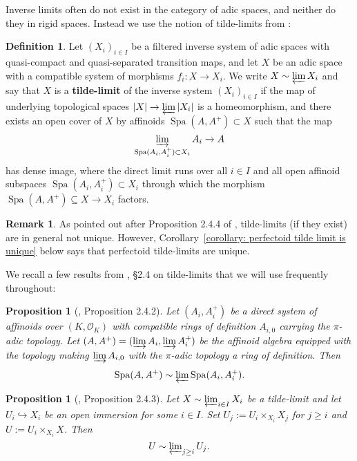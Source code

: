 \documentclass[10pt,oneside]{amsart}
\newtheorem{proposition}[theorem]{Proposition}
\theoremstyle{definition}
\newtheorem{definition}[theorem]{Definition}
\newtheorem{remark}[theorem]{Remark}
\begin{document}
	Inverse limits often do not exist in the category of adic spaces, and neither do they in rigid spaces. Instead we use the notion of tilde-limits from \cite[Definition 2.4.2]{huber2013etale}:	
	\begin{definition} 
Let $(X_i)_{i\in I}$ be a filtered inverse system of adic spaces with quasi-compact and quasi-separated transition maps, and let $X$ be an adic space with a compatible system of morphisms $f_i\colon X \rightarrow X_i$. We write $X \sim \varprojlim X_i$ and say that $X$ is a \textbf{tilde-limit} of the inverse system $(X_i)_{i\in I}$ if the map of underlying topological spaces $|X| \rightarrow \varprojlim |X_i|$ is a homeomorphism, and there exists an open cover of $X$ by affinoids $\operatorname{Spa} (A, A^+) \subset X$ such that the map 
$$ \varinjlim_{\operatorname{Spa}(A_i, A_i^+) \subset X_i} A_i \rightarrow A$$
has dense image, where the direct limit runs over all $i\in I$ and all open affinoid subspaces $\operatorname{Spa}(A_i, A_i^+) \subset X_i$ through which the morphism $\operatorname{Spa}(A, A^+) \subseteq X\rightarrow X_i$ factors.
	\end{definition}
	
	\begin{remark} \label{remark:tilde_limit_non_unique}
As pointed out after Proposition 2.4.4 of \cite{SW}, tilde-limits (if they exist) are in general not unique. However, Corollary~\ref{corollary: perfectoid tilde limit is unique} below says that perfectoid tilde-limits are unique.
	\end{remark}

We recall a few results from \cite{SW}, \S2.4 on tilde-limits that we will use frequently throughout:

\begin{proposition}[\cite{SW}, Proposition 2.4.2]\label{SW Proposition 2.4.2}
	Let $(A_i,A_i^{+})$ be a direct system of affinoids over $(K,\mathcal O_K)$ with compatible rings of definition $A_{i,0}$ carrying the $\pi$-adic topology. Let $(A,A^{+})=(\varinjlim A_i,\varinjlim A_i^{+})$ be the affinoid algebra equipped with the topology making $\varinjlim A_{i,0}$ with the $\pi$-adic topology a ring of definition. Then
	\[\operatorname{Spa}(A,A^{+})\sim \textstyle\varprojlim \operatorname{Spa}(A_i,A_i^{+}).\]
\end{proposition}
\begin{proposition}[\cite{SW}, Proposition 2.4.3]\label{SW Proposition 2.4.3}
	Let $X\sim \varprojlim_{i\in I} X_i$ be a tilde-limit and let $U_i\hookrightarrow X_i$ be an open immersion for some $i\in I$. Set $U_j:=U_i\times_{X_i}X_j$ for $j\geq i$ and $U:=U_i\times_{X_i}X$. Then 
	\[U\sim \textstyle\varprojlim_{j\geq i} U_j.\]
\end{proposition}
\end{document}
